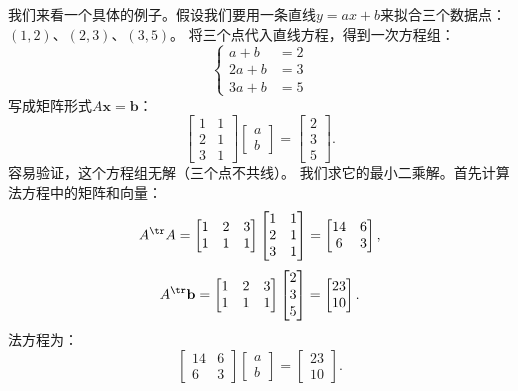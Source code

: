 \documentclass[12pt,UTF8]{ctexbook}
\begin{document}
我们来看一个具体的例子。假设我们要用一条直线$y = ax + b$来拟合三个数据点：
$(1, 2)$、$(2, 3)$、$(3, 5)$。
将三个点代入直线方程，得到一次方程组：
$$ \left\{
\begin{aligned}
a + b &= 2 \\
2a + b &= 3 \\
3a + b &= 5
\end{aligned}
\right. $$
写成矩阵形式$A\mathbf{x} = \mathbf{b}$：
$$ \begin{bmatrix} 1 & 1 \\ 2 & 1 \\ 3 & 1 \end{bmatrix} \begin{bmatrix} a \\ b \end{bmatrix} = \begin{bmatrix} 2 \\ 3 \\ 5 \end{bmatrix}. $$
容易验证，这个方程组无解（三个点不共线）。
我们求它的最小二乘解。首先计算法方程中的矩阵和向量：
$$ A^{\tr} A = \begin{bmatrix} 1 & 2 & 3 \\ 1 & 1 & 1 \end{bmatrix} \begin{bmatrix} 1 & 1 \\ 2 & 1 \\ 3 & 1 \end{bmatrix} = \begin{bmatrix} 14 & 6 \\ 6 & 3 \end{bmatrix}, $$
$$ A^{\tr} \mathbf{b} = \begin{bmatrix} 1 & 2 & 3 \\ 1 & 1 & 1 \end{bmatrix} \begin{bmatrix} 2 \\ 3 \\ 5 \end{bmatrix} = \begin{bmatrix} 23 \\ 10 \end{bmatrix}. $$
法方程为：
$$ \begin{bmatrix} 14 & 6 \\ 6 & 3 \end{bmatrix} \begin{bmatrix} a \\ b \end{bmatrix} = \begin{bmatrix} 23 \\ 10 \end{bmatrix}. $$
\end{document}
